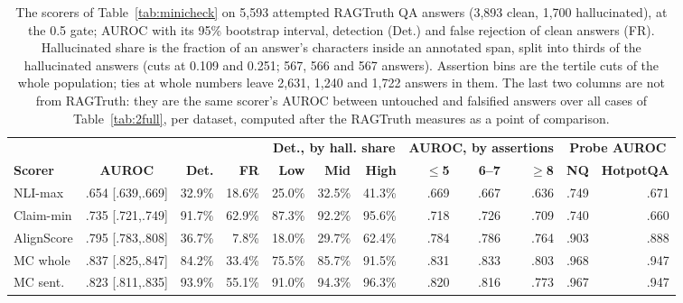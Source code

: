 \documentclass[11pt]{article}
\begin{document}
\begin{table}[t]
\centering
\footnotesize
\setlength{\tabcolsep}{4pt}
\begin{tabular}{lcrrrrrrrrrr}
\toprule
 & & & & \multicolumn{3}{c}{\textbf{Det., by hall. share}} & \multicolumn{3}{c}{\textbf{AUROC, by assertions}} & \multicolumn{2}{c}{\textbf{Probe AUROC}} \\
\cmidrule(lr){5-7}\cmidrule(lr){8-10}\cmidrule(lr){11-12}
\textbf{Scorer} & \textbf{AUROC} & \textbf{Det.} & \textbf{FR} & \textbf{Low} & \textbf{Mid} & \textbf{High} & \textbf{$\le$5} & \textbf{6--7} & \textbf{$\ge$8} & \textbf{NQ} & \textbf{HotpotQA} \\
\midrule
NLI-max & .654 [.639,.669] & 32.9\% & 18.6\% & 25.0\% & 32.5\% & 41.3\% & .669 & .667 & .636 & .749 & .671 \\
Claim-min & .735 [.721,.749] & 91.7\% & 62.9\% & 87.3\% & 92.2\% & 95.6\% & .718 & .726 & .709 & .740 & .660 \\
AlignScore & .795 [.783,.808] & 36.7\% & 7.8\% & 18.0\% & 29.7\% & 62.4\% & .784 & .786 & .764 & .903 & .888 \\
MC whole & .837 [.825,.847] & 84.2\% & 33.4\% & 75.5\% & 85.7\% & 91.5\% & .831 & .833 & .803 & .968 & .947 \\
MC sent. & .823 [.811,.835] & 93.9\% & 55.1\% & 91.0\% & 94.3\% & 96.3\% & .820 & .816 & .773 & .967 & .947 \\
\bottomrule
\end{tabular}
\caption{The scorers of Table~\ref{tab:minicheck} on 5,593 attempted RAGTruth QA answers (3,893 clean, 1,700 hallucinated), at the 0.5 gate; AUROC with its 95\% bootstrap interval, detection (Det.) and false rejection of clean answers (FR). Hallucinated share is the fraction of an answer's characters inside an annotated span, split into thirds of the hallucinated answers (cuts at 0.109 and 0.251; 567, 566 and 567 answers). Assertion bins are the tertile cuts of the whole population; ties at whole numbers leave 2,631, 1,240 and 1,722 answers in them. The last two columns are not from RAGTruth: they are the same scorer's AUROC between untouched and falsified answers over all cases of Table~\ref{tab:2full}, per dataset, computed after the RAGTruth measures as a point of comparison.}
\label{tab:ragtruth}
\end{table}
\end{document}
